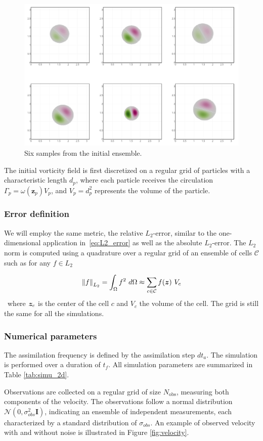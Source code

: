 \begin{figure}[ht]
	\centering
	\includegraphics[width=0.7\linewidth]{images/app2d/ensemble_sample.png}
	\caption{Six samples from the initial ensemble.}
	\label{fig:sample_ens}
\end{figure}

The initial vorticity field is first discretized on a regular grid of particles with a characteristic length $d_p$, where each particle receives the circulation $\Gamma_p = \omega(\bm z_p) V_p$, and $V_p = d_p^2$ represents the volume of the particle.

\subsubsection{Error definition}

We will employ the same metric, the relative \(L_2\)-error, similar to the one-dimensional application in~\ref{eq:L2_error} as well as the absolute \(L_2\)-error. The $L_2$ norm is computed using a quadrature over a regular grid of an ensemble of cells $\mathcal{C}$ such as for any $f \in L_2$

$$
	\left\lVert f \right\rVert_{L_2}  = \int_{\Omega} f^2~d\Omega \approx \sum_{c \in \mathcal{C}} f(\bm{z})~V_c
$$~where $\bm{z}_c$ is the center of the cell $c$ and $V_c$ the volume of the cell. The grid is still the same for all the simulations.

\subsubsection{Numerical parameters}

The assimilation frequency is defined by the assimilation step $dt_a$. The simulation is performed over a duration of $t_f$. All simulation parameters are summarized in Table \ref{tab:simu_2d}.

Observations are collected on a regular grid of size $N_{\text{obs}}$, measuring both components of the velocity. The observations follow a normal distribution $\mathcal N(0, \sigma_{obs}^2 \bm{I})$, indicating an ensemble of independent measurements, each characterized by a standard distribution of $\sigma_{obs}$. An example of observed velocity with and without noise is illustrated in Figure \ref{fig:velocity}.

